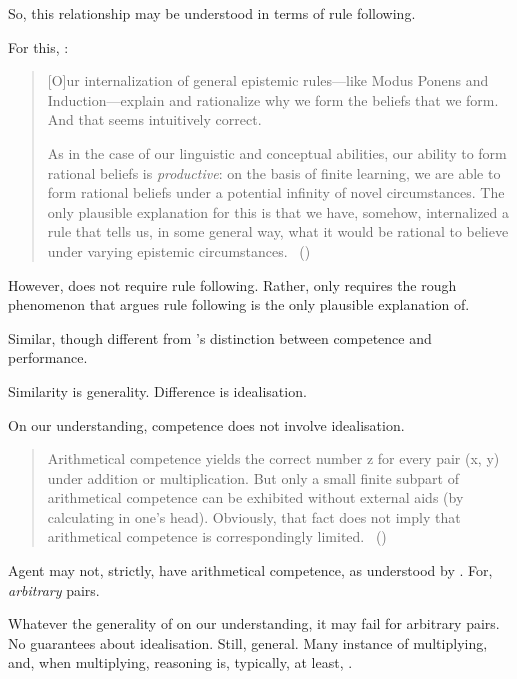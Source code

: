 \begin{note}
  So, this relationship may be understood in terms of rule following.

  For this, \citeauthor{Boghossian:2008vf}:

  \begin{quote}
    [O]ur internalization of general epistemic rules---like Modus Ponens and Induction---explain and rationalize why we form the beliefs that we form.
    And that seems intuitively correct.

    As in the case of our linguistic and conceptual abilities, our ability to form rational beliefs is \emph{productive}: on the basis of finite learning, we are able to form rational beliefs under a potential infinity of novel circumstances.
    The only plausible explanation for this is that we have, somehow, internalized a rule that tells us, in some general way, what it would be rational to believe under varying epistemic circumstances.%
    \mbox{ }\hfill\mbox{(\citeyear[483]{Boghossian:2008vf})}
  \end{quote}

  However, \sR{} does not require rule following.
  Rather, \sR{} only requires the rough phenomenon that \citeauthor{Boghossian:2008vf} argues rule following is the only plausible explanation of.
\end{note}

\begin{note}
  Similar, though different from \citeauthor{Chomsky:2015aa}'s distinction between competence and performance.

  Similarity is generality.
  Difference is idealisation.

  On our understanding, competence does not involve idealisation.

  \begin{quote}
    Arithmetical competence yields the correct number z for every pair (x, y) under addition or multiplication.
    But only a small finite subpart of arithmetical competence can be exhibited without external aids (by calculating in one's head).
    Obviously, that fact does not imply that arithmetical competence is correspondingly limited.\newline
    \mbox{ }\hfill\mbox{(\citeyear[xii]{Chomsky:2015aa})}
  \end{quote}

  Agent may not, strictly, have arithmetical competence, as understood by \citeauthor{Chomsky:2015aa}.
  For, \emph{arbitrary} pairs.

  Whatever the generality of  on our understanding, it may fail for arbitrary pairs.
  No guarantees about idealisation.
  Still, general.
  Many instance of multiplying, and, when multiplying, reasoning is, typically, at least, \sR{}.
\end{note}

